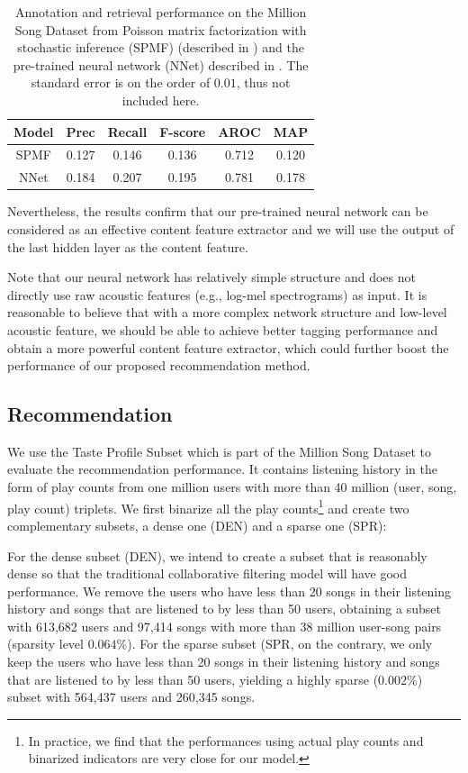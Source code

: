\begin{table}
\centering
  \begin{tabular}{ c  c  c  c  c  c }
    \toprule
    Model & Prec & Recall & F-score & AROC & MAP \\ \midrule
     SPMF & 0.127  &  0.146 & 0.136 & 0.712 & 0.120 \\
     NNet &  0.184 & 0.207   &  0.195  & 0.781  & 0.178 \\
    \bottomrule
  \end{tabular}
  \caption{Annotation and retrieval performance on the Million Song Dataset from Poisson matrix factorization with stochastic inference (SPMF) (described in ) and the pre-trained neural network (NNet) described in . The standard error is on the order of $0.01$, thus not included here.} 
  \label{chpt:content:tab:exp_tag}
\end{table}

Nevertheless, the results confirm that our pre-trained neural network can be considered as an effective content feature extractor and we will use the output of the last hidden layer as the content feature. 

Note that our neural network has relatively simple structure and does not directly use raw acoustic features (e.g., log-mel spectrograms) as input. It is reasonable to believe that with a more complex network structure and low-level acoustic feature, we should be able to achieve better tagging performance and obtain a more powerful content feature extractor, which could further boost the performance of our proposed recommendation method. 

 
\subsection{Recommendation}\label{chpt:content:sec:exp_rec}

We use the Taste Profile Subset which is part of the Million Song Dataset to evaluate the recommendation performance. It contains listening history in the form of play counts from one million users with more than 40 million (user, song, play count) triplets. We first binarize all the play counts\footnote{In practice, we find that the performances using actual play counts and binarized indicators are very close for our model.} and create two complementary subsets, a dense one (DEN) and a sparse one (SPR):

For the dense subset (DEN), we intend to create a subset that is reasonably dense so that the traditional collaborative filtering model will have good performance. We remove the users who have less than 20 songs in their listening history and songs that are listened to by less than 50 users, obtaining a subset with 613,682 users and 97,414 songs with more than 38 million user-song pairs (sparsity level $0.064\%$). For the sparse subset (SPR, on the contrary, we only keep the users who have less than 20 songs in their listening history and songs that are listened to by less than 50 users, yielding a highly sparse ($0.002\%$) subset with 564,437 users and 260,345 songs.

